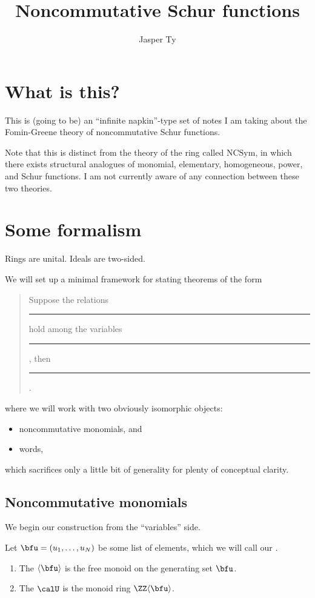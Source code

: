 \documentclass{article}
\title{Noncommutative Schur functions}
\author{Jasper Ty}
\date{}
\begin{document}
\maketitle

\section*{What is this?}

This is (going to be) an ``infinite napkin''-type set of notes I am taking about the Fomin-Greene theory of noncommutative Schur functions.

Note that this is distinct from the theory of the ring called $\mathrm{NCSym}$, in which there exists structural analogues of monomial, elementary, homogeneous, power, and Schur functions.
I am not currently aware of any connection between these two theories.

\tableofcontents

\newpage

\section{Some formalism}

\begin{convention}
    Rings are unital.
    Ideals are two-sided.
\end{convention}

We will set up a minimal framework for stating theorems of the form
\begin{quote}
    Suppose the relations \rule{1cm}{0.15mm} hold among the variables \rule{1cm}{0.15mm}, then \rule{1cm}{0.15mm}.
\end{quote}
where we will work with two obviously isomorphic objects:
\begin{itemize}
    \item
        noncommutative monomials, and
    \item
        words,
\end{itemize}
which sacrifices only a little bit of generality for plenty of conceptual clarity.

\subsection{Noncommutative monomials}

We begin our construction from the ``variables'' side.

\begin{definition}
    \label{def:nc}
    Let $\bfu = (u_1,\ldots,u_N)$ be some list of elements, which we will call our .
    \begin{enumerate}[label=(\alph*)]
        \item 
            \label{def:ncMonomials}
            The  $\langle \bfu \rangle$ is the free monoid on the generating set $\bfu$.
        \item 
            \label{def:FreeAssociativeRing}
            The  $\calU$ is the monoid ring $\ZZ\langle\bfu\rangle$. 
    \end{enumerate}
\end{definition}
\end{document}

